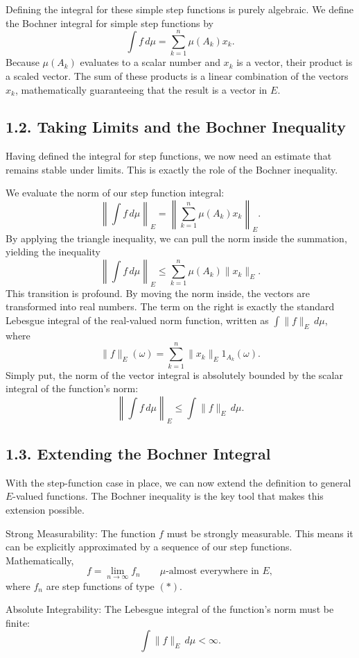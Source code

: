 \documentclass[11pt]{article}
\theoremstyle{definition}
\theoremstyle{remark}
\begin{document}
Defining the integral for these simple step functions is purely algebraic. We define the Bochner integral for simple step functions by
\[
\int f\,d\mu=\sum_{k=1}^{n}\mu(A_k)x_k.
\]
Because \(\mu(A_k)\) evaluates to a scalar number and \(x_k\) is a vector, their product is a scaled vector. The sum of these products is a linear combination of the vectors \(x_k\), mathematically guaranteeing that the result is a vector in \(E\).

\subsection*{1.2. Taking Limits and the Bochner Inequality}
Having defined the integral for step functions, we now need an estimate that remains stable under limits. This is exactly the role of the Bochner inequality.

We evaluate the norm of our step function integral:
\[
\left\|\int f\,d\mu\right\|_E
=
\left\|\sum_{k=1}^{n}\mu(A_k)x_k\right\|_E.
\]
By applying the triangle inequality, we can pull the norm inside the summation, yielding the inequality
\[
\left\|\int f\,d\mu\right\|_E
\le
\sum_{k=1}^{n}\mu(A_k)\|x_k\|_E.
\]
This transition is profound. By moving the norm inside, the vectors are transformed into real numbers. The term on the right is exactly the standard Lebesgue integral of the real-valued norm function, written as \(\int \|f\|_E\,d\mu\), where
\[
\|f\|_E(\omega)=\sum_{k=1}^{n}\|x_k\|_E 1_{A_k}(\omega).
\]
Simply put, the norm of the vector integral is absolutely bounded by the scalar integral of the function's norm:
\[
\left\|\int f\,d\mu\right\|_E\le \int \|f\|_E\,d\mu.
\]

\subsection*{1.3. Extending the Bochner Integral}
With the step-function case in place, we can now extend the definition to general \(E\)-valued functions. The Bochner inequality is the key tool that makes this extension possible.

Strong Measurability: The function \(f\) must be strongly measurable. This means it can be explicitly approximated by a sequence of our step functions. Mathematically,
\[
f=\lim_{n\to\infty} f_n
\qquad \text{\(\mu\)-almost everywhere in } E,
\]
where \(f_n\) are step functions of type \((*)\).

Absolute Integrability: The Lebesgue integral of the function's norm must be finite:
\[
\int \|f\|_E\,d\mu<\infty.
\]
\end{document}
